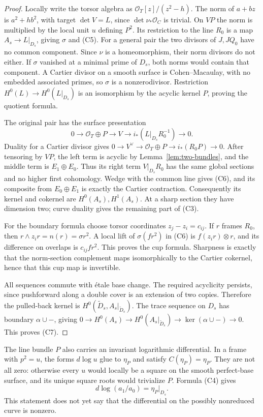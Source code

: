 \documentclass[11pt]{article}
\theoremstyle{definition}\newtheorem{definition}[theorem]{Definition}
\theoremstyle{remark}\newtheorem{remark}[theorem]{Remark}
\newcommand{\OO}{\mathcal O}
\begin{document}
\begin{proof}
Locally write the torsor algebra as $\OO_T[z]/(z^2-h)$. The norm of $a+bz$ is $a^2+hb^2$, with target $\det V=L$, since $\det\nu_*\OO_C$ is trivial. On $VP$ the norm is multiplied by the local unit $u$ defining $P^2$. Its restriction to the line $R_0$ is a map $A_s\to L|_{D_s}$, giving $\sigma$ and (C5). For a general pair the two divisors of $J,JQ_0$ have no common component. Since $\nu$ is a homeomorphism, their norm divisors do not either. If $\sigma$ vanished at a minimal prime of $D_s$, both norms would contain that component. A Cartier divisor on a smooth surface is Cohen--Macaulay, with no embedded associated primes, so $\sigma$ is a nonzerodivisor. Restriction $H^0(L)\to H^0(L|_{D_s})$ is an isomorphism by the acyclic kernel $P$, proving the quotient formula.

The original pair has the surface presentation
\[
 0\to\OO_T\oplus P\to V\to i_*(L|_{D_s}R_0^{-1})\to0.
\]
Duality for a Cartier divisor gives
$0\to V^\vee\to\OO_T\oplus P\to i_*(R_0P)\to0$.
After tensoring by $VP$, the left term is acyclic by Lemma~\ref{lem:two-bundles}, and the middle term is $E_1\oplus E_0$. Thus its right term $V|_{D_s}R_0$ has the same global sections and no higher first cohomology. Wedge with the common line gives (C6), and its composite from $E_0\oplus E_1$ is exactly the Cartier contraction. Consequently its kernel and cokernel are $H^0(A_s),H^1(A_s)$. At a sharp section they have dimension two; curve duality gives the remaining part of (C3).

For the boundary formula choose torsor coordinates $z_j-z_i=c_{ij}$. If $r$ frames $R_0$, then $r\wedge z_ir=n(r)=\sigma r^2$. A local lift of $\sigma(fr^2)$ in (C6) is $f(z_ir)\otimes r$, and its difference on overlaps is $c_{ij}fr^2$. This proves the cup formula. Sharpness is exactly that the norm-section complement maps isomorphically to the Cartier cokernel, hence that this cup map is invertible.

All sequences commute with \'etale base change. The required acyclicity persists, since pushforward along a double cover is an extension of two copies. Therefore the pulled-back kernel is $H^0(\widetilde D_s,A_s|_{\widetilde D_s})$. The trace sequence on $D_s$ has boundary $\alpha\cup-$, giving
$0\to H^0(A_s)\to H^0(A_s|_{\widetilde D_s})\to\ker(\alpha\cup-)\to0$.
This proves (C7).
\end{proof}

The line bundle $P$ also carries an invariant logarithmic differential. In a frame with $p^2=u$, the forms $d\log u$ glue to $\eta_P$ and satisfy $C(\eta_P)=\eta_P$. They are not all zero: otherwise every $u$ would locally be a square on the smooth perfect-base surface, and its unique square roots would trivialize $P$. Formula (C4) gives
\[
                       d\log(a_1/a_0)=\eta_P|_{D_s}.       \tag{C8}
\]
This statement does not yet say that the differential on the possibly nonreduced curve is nonzero.
\end{document}
